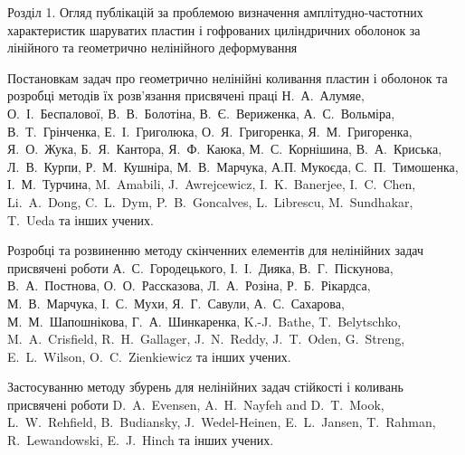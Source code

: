\documentclass[handout, 8pt]{beamer}
\numberwithin{figure}{section}
\numberwithin{equation}{section}
\numberwithin{table}{section}
\begin{document}
\begin{frame}{Розділ 1. Огляд публікацій за проблемою визначення  амплітудно-частотних характеристик шаруватих пластин і гофрованих циліндричних оболонок за лінійного та геометрично нелінійного деформування}



\medskip
Постановкам задач про геометрично нелінійні коливання пластин і оболонок та розробці методів їх розв'язання присвячені праці Н.~А.~Алумяе,  О.~І.~Беспалової, В.~В.~Болотіна, В.~Є.~Вериженка, А.~С.~Вольміра, В.~Т.~Грінченка, Е.~І.~Григолюка, О.~Я.~Григоренка, Я.~М.~Григоренка, Я.~О.~Жука, Б.~Я.~Кантора, Я.~Ф.~Каюка, М.~С.~Корнішина, В.~А.~Криська, Л.~В.~Курпи, Р.~М.~Кушніра, М.~В.~Марчука, А.П. Мукоєда, С.~П.~Тимошенка, І.~М.~Турчина, M.~Amabili, J.~Awrejcewicz, I.~K.~Banerjee, I.~C.~Chen, Li.~A.~Dong, C.~L.~Dym, P.~B.~Goncalves,  L.~Librescu, M.~Sundhakar, T.~Ueda та інших учених.

\medskip 
Розробці та розвиненню методу скінченних елементів для нелінійних задач присвячені роботи А.~С.~Городецького, І.~І.~Дияка, В.~Г.~Піскунова, В.~А.~Постнова, О.~О.~Рассказова, Л.~А.~Розіна, Р.~Б.~Рікардса, М.~В.~Марчука, І.~С.~Мухи, Я.~Г.~Савули, А.~С.~Сахарова, М.~М.~Шапошнікова, Г.~А.~Шинкаренка, K.-J.~Bathe, T.~Belytschko, M.~A.~Crisfield, R.~H.~Gallager, J.~N.~Reddy, J.~T.~Oden, G.~Streng, E.~L.~Wilson, O.~C.~Zienkiewicz та інших учених.

\medskip 
Застосуванню методу збурень для нелінійних задач стійкості і коливань присвячені роботи D.~A.~Evensen, A.~H.~Nayfeh and D.~T.~Mook, L.~W.~Rehfield, B.~Budiansky, J.~Wedel-Heinen, E.~L.~Jansen, T.~Rahman, R.~Lewandowski, E.~J.~Hinch та інших учених.


\end{frame}

%
%
%
%
%
%
%
\end{document}
